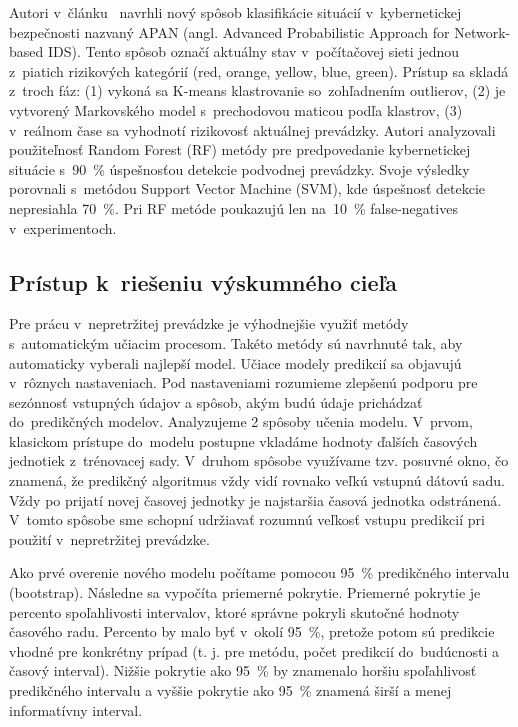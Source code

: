 \documentclass[thesismargins, thesislinespacing, openright, upjsfrontpage]{rnthesis}
\begin{document}
Autori v~článku~\cite{shin2013advanced} navrhli nový spôsob klasifikácie situácií v~kybernetickej bezpečnosti nazvaný APAN (angl. Advanced Probabilistic Approach for Network-based IDS). Tento spôsob označí aktuálny stav v~počítačovej sieti jednou z~piatich rizikových kategórií ({red, orange, yellow, blue, green}). Prístup sa skladá z~troch fáz: (1) vykoná sa K-means klastrovanie so~zohľadnením outlierov, (2) je vytvorený Markovského model s~prechodovou maticou podľa klastrov, (3) v~reálnom čase sa vyhodnotí rizikovosť aktuálnej prevádzky. Autori \cite{liu2015cloudy} analyzovali použiteľnosť Random Forest (RF) metódy pre predpovedanie kybernetickej situácie s~90~\% úspešnosťou detekcie podvodnej prevádzky. Svoje výsledky porovnali s~metódou Support Vector Machine (SVM), kde úspešnosť detekcie nepresiahla 70~\%. Pri RF metóde poukazujú len na~10~\% false-negatives v~experimentoch.

\subsection{Prístup k~riešeniu výskumného cieľa}\label{c2_metodologia}

Pre prácu v~nepretržitej prevádzke je výhodnejšie využiť metódy s~automatickým učiacim procesom. Takéto metódy sú navrhnuté tak, aby automaticky vyberali najlepší model. Učiace modely predikcií sa objavujú v~rôznych nastaveniach. Pod nastaveniami rozumieme zlepšenú podporu pre sezónnosť vstupných údajov a spôsob, akým budú údaje prichádzať do~predikčných modelov. Analyzujeme 2 spôsoby učenia modelu. V~prvom, klasickom prístupe do~modelu postupne vkladáme hodnoty ďalších časových jednotiek z~trénovacej sady. V~druhom spôsobe využívame tzv. posuvné okno, čo znamená, že predikčný algoritmus vždy vidí rovnako veľkú vstupnú dátovú sadu. Vždy po prijatí novej časovej jednotky je najstaršia časová jednotka odstránená. V~tomto spôsobe sme schopní udržiavať rozumnú veľkosť vstupu predikcií pri použití v~nepretržitej prevádzke.

Ako prvé overenie nového modelu počítame pomocou 95~\% predikčného intervalu (bootstrap). Následne sa vypočíta priemerné pokrytie. Priemerné pokrytie je percento spoľahlivosti intervalov, ktoré správne pokryli skutočné hodnoty časového radu. Percento by malo byť v~okolí 95~\%, pretože potom sú predikcie vhodné pre konkrétny prípad (t. j. pre metódu, počet predikcií do~budúcnosti a časový interval). Nižšie pokrytie ako 95~\% by znamenalo horšiu spoľahlivosť predikčného intervalu a vyššie pokrytie ako 95~\% znamená širší a menej informatívny interval.
\end{document}
